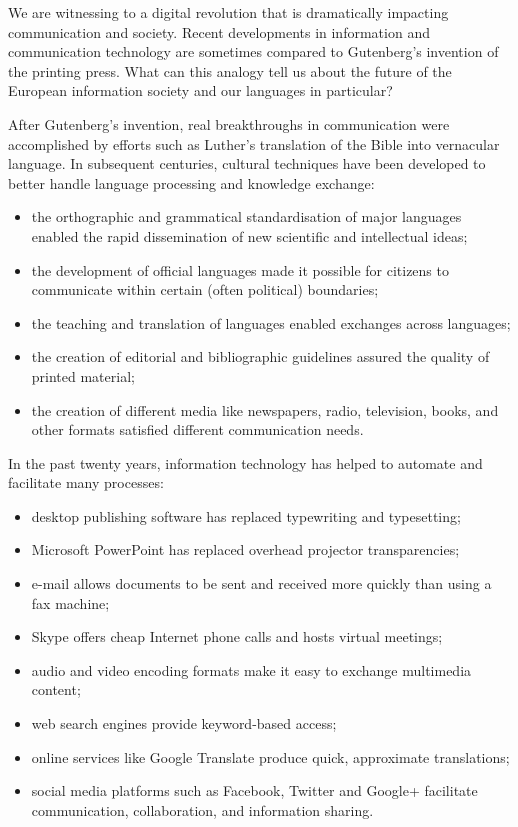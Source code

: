 \documentclass[]{../metanetpaper}
\begin{document}
\begin{multicols}{2}

We are witnessing to a digital revolution that is dramatically impacting communication and society. Recent developments in information and communication technology are sometimes compared to Gutenberg’s invention of the printing press. What can this analogy tell us about the future of the European information society and our languages in particular?


After Gutenberg’s invention, real breakthroughs in communication were accomplished by efforts such as Luther’s translation of the Bible into vernacular language. In subsequent centuries, cultural techniques have been developed to better handle language processing and knowledge exchange:

\begin{itemize}
\item the orthographic and grammatical standardisation of major languages enabled the rapid dissemination of new scientific and intellectual ideas;
\item the development of official languages made it possible for citizens to communicate within certain (often political) boundaries;
\item the teaching and translation of languages enabled exchanges across languages;
\item the creation of editorial and bibliographic guidelines assured the quality of printed material;
\item the creation of different media like newspapers, radio, television, books, and other formats satisfied different communication needs. 
\end{itemize}

In the past twenty years, information technology has helped to automate and facilitate many processes:

\begin{itemize}
\item desktop publishing software has replaced typewriting and typesetting;
\item Microsoft PowerPoint has replaced overhead projector transparencies;
\item e-mail allows documents to be sent and received more quickly than using a fax machine;
\item Skype offers cheap Internet phone calls and hosts virtual meetings;
\item audio and video encoding formats make it easy to exchange multimedia content;
\item web search engines provide keyword-based access;
\item online services like Google Translate produce quick, approximate translations;
\item social media platforms such as Facebook, Twitter and Google+ facilitate communication, collaboration, and information sharing.
\end{itemize}


\end{multicols}
\end{document}
